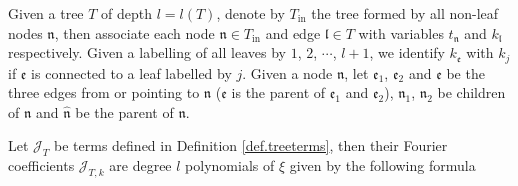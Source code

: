 \begin{lem}\label{lem.treeterms} Given a tree $T$ of depth $l=l(T)$, denote by $T_{\text{in}}$ the tree formed by all non-leaf nodes $\mathfrak{n}$, then associate each node $\mathfrak{n}\in T_{\text{in}}$ and edge $\mathfrak{l}\in T$ with variables $t_{\mathfrak{n}}$ and $k_{\mathfrak{l}}$ respectively. Given a labelling of all leaves by $1$, $2$, $\cdots$, $l+1$, we identify $k_{\mathfrak{e}}$ with $k_j$ if $\mathfrak{e}$ is connected to a leaf labelled by $j$. Given a node $\mathfrak{n}$, let $\mathfrak{e}_1$, $\mathfrak{e}_2$ and $\mathfrak{e}$ be the three edges from or pointing to $\mathfrak{n}$ ($\mathfrak{e}$ is the parent of $\mathfrak{e}_1$ and $\mathfrak{e}_2$), $\mathfrak{n}_1$, $\mathfrak{n}_2$ be children of $\mathfrak{n}$ and $\hat{\mathfrak{n}}$ be the parent of $\mathfrak{n}$. 

Let $\mathcal{J}_T$ be terms defined in Definition \ref{def.treeterms}, then their Fourier coefficients $\mathcal{J}_{T,k}$ are degree $l$ polynomials of $\xi$ given by the following formula


\end{lem}
